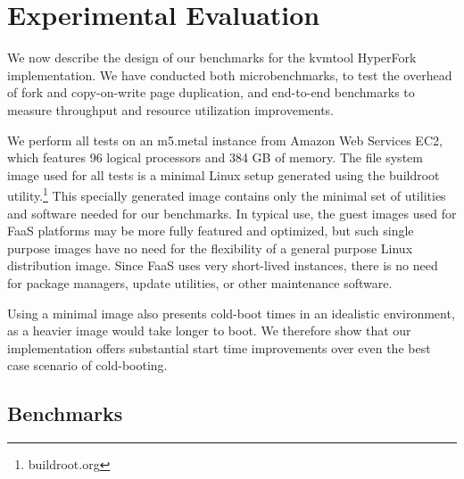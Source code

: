 \section{Experimental Evaluation} \label{sec:experiments} We now describe the
design of our benchmarks for the kvmtool HyperFork implementation. We have
conducted both microbenchmarks, to test the overhead of fork and copy-on-write
page duplication, and end-to-end benchmarks to measure throughput and resource
utilization improvements.

We perform all tests on an m5.metal instance from Amazon Web Services EC2,
which features 96 logical processors and 384 GB of memory. The file system
image used for all tests is a minimal Linux setup generated using the buildroot
utility.\footnote{buildroot.org} This specially generated image contains only
the minimal set of utilities and software needed for our benchmarks. In typical
use, the guest images used for FaaS platforms may be more fully featured and
optimized, but such single purpose images have no need for the flexibility of a
general purpose Linux distribution image. Since FaaS uses very short-lived
instances, there is no need for package managers, update utilities, or other
maintenance software.

Using a minimal image also presents cold-boot times in an idealistic
environment, as a heavier image would take longer to boot. We therefore show
that our implementation offers substantial start time improvements over even
the best case scenario of cold-booting.

\subsection{Benchmarks}

